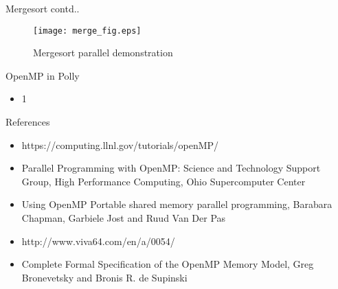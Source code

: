 \documentclass[10pt]{beamer}
\begin{document}
\begin{frame}{Mergesort contd..}
\begin{figure}
\begin{center}
\texttt{[image: merge\_fig.eps]}
\caption{Mergesort parallel demonstration}
\end{center}
\end{figure}
\end{frame}

\begin{frame}{OpenMP in Polly}
\begin{itemize}
\item 1
\end{itemize}
\end{frame}


\begin{frame}{References}
\begin{itemize}
\item https://computing.llnl.gov/tutorials/openMP/
\item Parallel Programming with OpenMP: Science and Technology Support Group, High Performance Computing, Ohio Supercomputer Center
\item Using OpenMP Portable shared memory parallel programming, Barabara Chapman, Garbiele Jost and Ruud Van Der Pas
\item http://www.viva64.com/en/a/0054/
\item Complete Formal Specification of the OpenMP Memory Model,
  Greg Bronevetsky and Bronis R. de Supinski
\end{itemize}
\end{frame}
\end{document}
